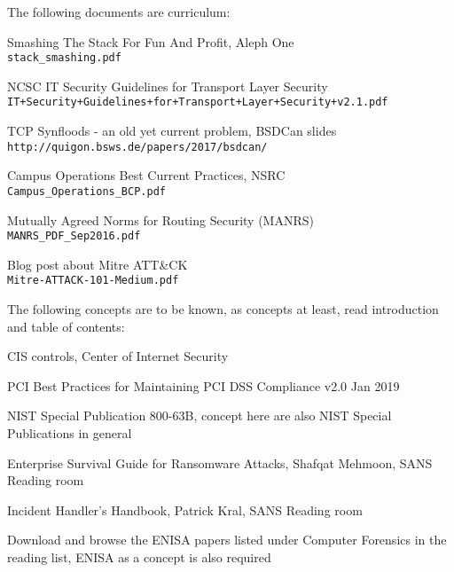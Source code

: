 \documentclass[a4paper,11pt,notitlepage,landscape]{report}
\begin{document}
The following documents are curriculum:
\begin{list2}
\item Smashing The Stack For Fun And Profit, Aleph One\\
\verb+stack_smashing.pdf+
\item NCSC IT Security Guidelines for Transport Layer Security\\
\verb_IT+Security+Guidelines+for+Transport+Layer+Security+v2.1.pdf_
\item TCP Synfloods - an old yet current problem, BSDCan slides\\
\verb+http://quigon.bsws.de/papers/2017/bsdcan/+
\item Campus Operations Best Current Practices, NSRC\\
\verb+Campus_Operations_BCP.pdf+
\item Mutually Agreed Norms for Routing Security (MANRS)\\
\verb+MANRS_PDF_Sep2016.pdf+
\item Blog post about Mitre ATT\&CK\\
\verb+Mitre-ATTACK-101-Medium.pdf+
\end{list2}


The following concepts are to be known, as concepts at least, read introduction and table of contents:
\begin{list2}
\item CIS controls, Center of Internet Security
\item PCI Best Practices for Maintaining PCI DSS Compliance v2.0 Jan 2019
\item NIST Special Publication 800-63B, concept here are also NIST Special Publications in general
\item Enterprise Survival Guide for Ransomware Attacks, Shafqat Mehmoon, SANS Reading room
\item Incident Handler's Handbook, Patrick Kral, SANS Reading room
\item Download and browse the ENISA papers listed under Computer Forensics in the reading list, ENISA as a concept is also required
\end{list2}
\end{document}
